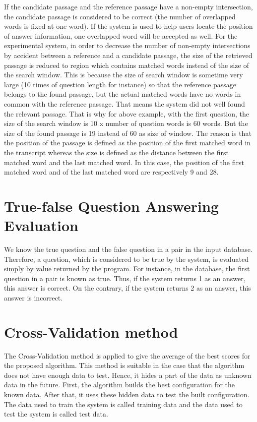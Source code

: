 If the candidate passage and the reference passage have a non-empty intersection, the candidate passage is considered to be correct (the number of overlapped words is fixed at one word). If the system is used to help users locate the position of answer information, one overlapped word will be accepted as well. For the experimental system, in order to decrease the number of non-empty intersections by accident between a reference and a candidate passage, the size of the retrieved passage is reduced to region which contains matched words instead of the size of the search window. This is because the size of search window is sometime very large (10 times of question length for instance) so that the reference passage belongs to the found passage, but the actual matched words have no words in common with the reference passage. That means the system did not well found the relevant passage. That is why for above example, with the first question, the size of the search window is 10 x number of question words is 60 words. But the size of the found passage is 19 instead of 60 as size of window. The reason is that the position of the passage is defined as the position of the first matched word in the transcript whereas the size is defined as the distance between the first matched word and the last matched word. In this case, the position of the first matched word and of the last matched word are respectively 9 and 28.


\section{True-false Question Answering Evaluation}

We know the true question and the false question in a pair in the input database. Therefore, a question, which is considered to be true by the system, is evaluated simply by value returned by the program. For instance, in the database, the first question in a pair is known as true.  Thus, if the system returns 1 as an answer, this answer is correct. On the contrary, if the system returns 2 as an answer, this answer is incorrect.




\section{Cross-Validation method}
 
 The Cross-Validation method \cite{kohavi1995scv} is applied to give the average of the best scores for the proposed algorithm. This method is suitable in the case that the algorithm does not have enough data to test. Hence, it hides a part of the data as unknown data in the future. First, the algorithm builds the best configuration for the known data. After that, it uses these hidden data to test the built configuration. The data used to train the system is called training data and the data used to test the system is called test data.
 
